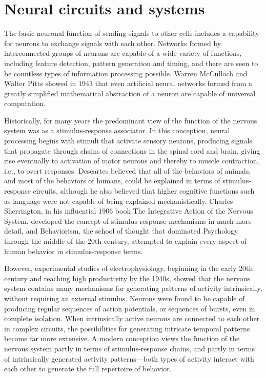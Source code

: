 \documentclass[]{book}
\begin{document}
\hypertarget{neural-circuits-and-systems}{%
\section{Neural circuits and systems}\label{neural-circuits-and-systems}}

The basic neuronal function of sending signals to other cells includes a capability for neurons to exchange signals with each other. Networks formed by interconnected groups of neurons are capable of a wide variety of functions, including feature detection, pattern generation and timing, and there are seen to be countless types of information processing possible. Warren McCulloch and Walter Pitts showed in 1943 that even artificial neural networks formed from a greatly simplified mathematical abstraction of a neuron are capable of universal computation.

Historically, for many years the predominant view of the function of the nervous system was as a stimulus-response associator. In this conception, neural processing begins with stimuli that activate sensory neurons, producing signals that propagate through chains of connections in the spinal cord and brain, giving rise eventually to activation of motor neurons and thereby to muscle contraction, i.e., to overt responses. Descartes believed that all of the behaviors of animals, and most of the behaviors of humans, could be explained in terms of stimulus-response circuits, although he also believed that higher cognitive functions such as language were not capable of being explained mechanistically. Charles Sherrington, in his influential 1906 book The Integrative Action of the Nervous System, developed the concept of stimulus-response mechanisms in much more detail, and Behaviorism, the school of thought that dominated Psychology through the middle of the 20th century, attempted to explain every aspect of human behavior in stimulus-response terms.

However, experimental studies of electrophysiology, beginning in the early 20th century and reaching high productivity by the 1940s, showed that the nervous system contains many mechanisms for generating patterns of activity intrinsically, without requiring an external stimulus. Neurons were found to be capable of producing regular sequences of action potentials, or sequences of bursts, even in complete isolation. When intrinsically active neurons are connected to each other in complex circuits, the possibilities for generating intricate temporal patterns become far more extensive. A modern conception views the function of the nervous system partly in terms of stimulus-response chains, and partly in terms of intrinsically generated activity patterns---both types of activity interact with each other to generate the full repertoire of behavior.
\end{document}

